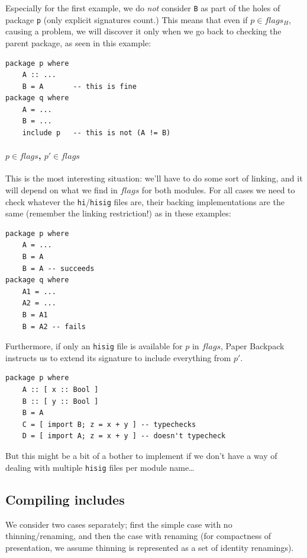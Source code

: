 \documentclass{article}
\begin{document}
Especially for the first example, we do \emph{not} consider \texttt{B} as
part of the holes of package \texttt{p} (only explicit signatures count.)
This means that even if $p\in flags_H$, causing a problem, we will discover
it only when we go back to checking the parent package, as seen in this
example:

\begin{verbatim}
package p where
    A :: ...
    B = A       -- this is fine
package q where
    A = ...
    B = ...
    include p   -- this is not (A != B)
\end{verbatim}

\paragraph{$p\in flags$, $p'\in flags$ }
This is the most interesting situation: we'll have to do some sort of linking,
and it will depend on what we find in $flags$ for both modules.  For all cases
we need to check whatever the \texttt{hi}/\texttt{hisig} files are, their backing
implementations are the same (remember the linking restriction!) as in these
examples:

\begin{verbatim}
package p where
    A = ...
    B = A
    B = A -- succeeds
package q where
    A1 = ...
    A2 = ...
    B = A1
    B = A2 -- fails
\end{verbatim}

Furthermore, if only an \texttt{hisig} file is available for $p$ in $flags$, Paper
Backpack instructs us to extend its signature to include everything from $p'$.

\begin{verbatim}
package p where
    A :: [ x :: Bool ]
    B :: [ y :: Bool ]
    B = A
    C = [ import B; z = x + y ] -- typechecks
    D = [ import A; z = x + y ] -- doesn't typecheck
\end{verbatim}

But this might be a bit of a bother to implement if we don't have a way of dealing
with multiple \texttt{hisig} files per module name\ldots

\subsection{Compiling includes}

We consider two cases separately; first the simple case with no
thinning/renaming, and then the case with renaming (for compactness of
presentation, we assume thinning is represented as a set of identity
renamings).
\end{document}
